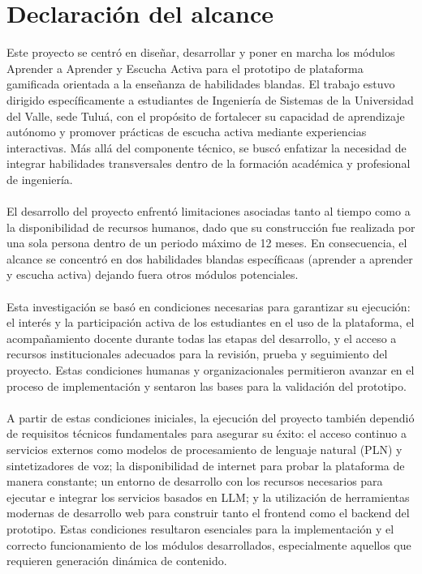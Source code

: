 \section{Declaración del alcance}
Este proyecto se centró en diseñar, desarrollar y poner en marcha los módulos Aprender a Aprender y Escucha Activa para el prototipo de plataforma gamificada orientada a la enseñanza de habilidades blandas. El trabajo estuvo dirigido específicamente a estudiantes de Ingeniería de Sistemas de la Universidad del Valle, sede Tuluá, con el propósito de fortalecer su capacidad de aprendizaje autónomo y promover prácticas de escucha activa mediante experiencias interactivas. Más allá del componente técnico, se buscó enfatizar la necesidad de integrar habilidades transversales dentro de la formación académica y profesional de ingeniería.
\\
\\
El desarrollo del proyecto enfrentó limitaciones asociadas tanto al tiempo como a la disponibilidad de recursos humanos, dado que su construcción fue realizada por una sola persona dentro de un periodo máximo de 12 meses. En consecuencia, el alcance se concentró en dos habilidades blandas específicaas (aprender a aprender y escucha activa) dejando fuera otros módulos potenciales. 
\\
\\
Esta investigación se basó en condiciones necesarias para garantizar su ejecución: el interés y la participación activa de los estudiantes en el uso de la plataforma, el acompañamiento docente durante todas las etapas del desarrollo, y el acceso a recursos institucionales adecuados para la revisión, prueba y seguimiento del proyecto. Estas condiciones humanas y organizacionales permitieron avanzar en el proceso de implementación y sentaron las bases para la validación del prototipo.
\\
\\
A partir de estas condiciones iniciales, la ejecución del proyecto también dependió de requisitos técnicos fundamentales para asegurar su éxito: el acceso continuo a servicios externos como modelos de procesamiento de lenguaje natural (PLN) y sintetizadores de voz; la disponibilidad de internet para probar la plataforma de manera constante; un entorno de desarrollo con los recursos necesarios para ejecutar e integrar los servicios basados en LLM; y la utilización de herramientas modernas de desarrollo web para construir tanto el frontend como el backend del prototipo. Estas condiciones resultaron esenciales para la implementación y el correcto funcionamiento de los módulos desarrollados, especialmente aquellos que requieren generación dinámica de contenido.
